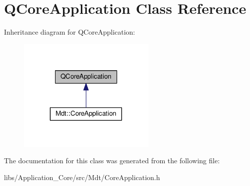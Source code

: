 \hypertarget{class_q_core_application}{}\section{Q\+Core\+Application Class Reference}
\label{class_q_core_application}


Inheritance diagram for Q\+Core\+Application\+:\nopagebreak
\begin{figure}[H]
\begin{center}
\leavevmode
\includegraphics[width=188pt]{class_q_core_application__inherit__graph}
\end{center}
\end{figure}


The documentation for this class was generated from the following file\+:\begin{DoxyCompactItemize}
\item 
libs/\+Application\+\_\+\+Core/src/\+Mdt/Core\+Application.\+h\end{DoxyCompactItemize}
